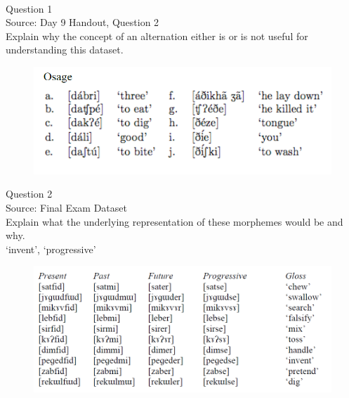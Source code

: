 \documentclass[12pt]{article}
\begin{document}
\newpage

\begin{center}
\textbf{{\color{red}{\HUGE END OF EXAM}}}\\

\end{center}
\newpage

\begin{center}
\textbf{{\color{blue}{\HUGE START OF EXAM\\}}}

\textbf{{\color{blue}{\HUGE Student ID: 1887\\}}}

\textbf{{\color{blue}{\HUGE 11:30 - 11:50 AM\\}}}

\end{center}
\newpage

{\large Question 1}\\

Source: Day 9 Handout, Question 2\\

Explain why the concept of an alternation either is or is not useful for understanding this dataset.\\

\begin{figure}[H]
\includegraphics{../images/osage.png}
\end{figure}

\newpage

{\large Question 2}\\

Source: Final Exam Dataset\\

Explain what the underlying representation of these morphemes would be and why.\\

`invent', `progressive'

\begin{figure}[H]
\includegraphics{../images/final_dataset.png}
\end{figure}
\end{document}
